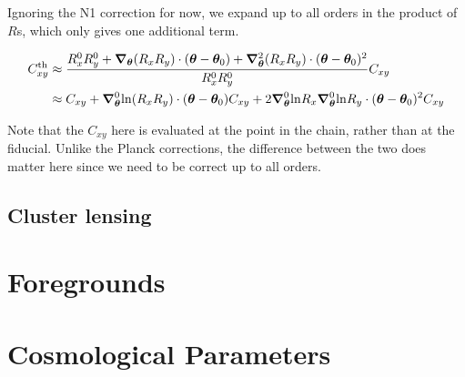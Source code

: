 \documentclass[a4paper, 11pt]{article}
\begin{document}
Ignoring the N1 correction for now, we expand up to all orders in the product of $R$s, which only gives one additional term.

\begin{align*}
C_{xy}^{\mathrm{th}}&\approx\frac{R^0_xR^0_y+\boldsymbol{\nabla}_{\boldsymbol{\theta}} (R_xR_y)\cdot (\boldsymbol{\theta}-\boldsymbol{\theta}_0)+\boldsymbol{\nabla}^2_{\boldsymbol{\theta}} (R_xR_y)\cdot (\boldsymbol{\theta}-\boldsymbol{\theta}_0)^2}{R^0_xR^0_y}C_{xy}  \\
&\approx C_{xy}+\boldsymbol{\nabla}^0_{\boldsymbol{\theta}} \mathrm{ln}(R_xR_y)\cdot (\boldsymbol{\theta}-\boldsymbol{\theta}_0)C_{xy} +2\boldsymbol{\nabla}^0_{\boldsymbol{\theta}} \mathrm{ln}R_x\boldsymbol{\nabla}^0_{\boldsymbol{\theta}}\mathrm{ln}R_y\cdot (\boldsymbol{\theta}-\boldsymbol{\theta}_0)^2C_{xy} 
\end{align*}

Note that the $C_{xy}$ here is evaluated at the point in the chain, rather than at the fiducial. Unlike the Planck corrections, the difference between the two does matter here since we need to be correct up to all orders.

\subsection{Cluster lensing}

\section{Foregrounds }


\section{Cosmological Parameters }
\end{document}
